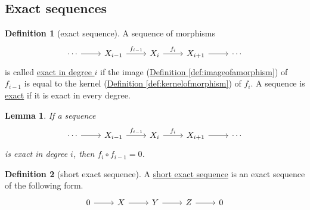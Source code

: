 \documentclass[a4paper]{report}
\newcommand{\defn}[1]{\ul{#1}}
\theoremstyle{definition}
\newtheorem{definition}{Definition}[section]
\theoremstyle{plain}
\newtheorem{lemma}{Lemma}[section]
\theoremstyle{remark}
\begin{document}
\subsection{Exact sequences}
\begin{definition}[exact sequence]
  \label{def:exactsequence}
  A sequence of morphisms
  \begin{equation*}
    \begin{tikzcd}
      \cdots
      \arrow[r]
      & X_{i-1}
      \arrow[r, "f_{i-1}"]
      & X_{i}
      \arrow[r, "f_{i}"]
      & X_{i+1}
      \arrow[r]
      & \cdots
    \end{tikzcd}
  \end{equation*}
  is called \defn{exact in degree $i$} if the image (\hyperref[def:imageofamorphism]{Definition \ref*{def:imageofamorphism}}) of $f_{i-1}$ is equal to the kernel (\hyperref[def:kernelofmorphism]{Definition \ref*{def:kernelofmorphism}}) of $f_{i}$. A sequence is \defn{exact} if it is exact in every degree.
\end{definition}

\begin{lemma}
  If a sequence
  \begin{equation*}
    \begin{tikzcd}
      \cdots
      \arrow[r]
      & X_{i-1}
      \arrow[r, "f_{i-1}"]
      & X_{i}
      \arrow[r, "f_{i}"]
      & X_{i+1}
      \arrow[r]
      & \cdots
    \end{tikzcd}
  \end{equation*}
  is exact in degree $i$, then $f_{i} \circ f_{i-1} = 0$.
\end{lemma}

\begin{definition}[short exact sequence]
  \label{def:shortexactsequence}
  A \defn{short exact sequence} is an exact sequence of the following form.
  \begin{equation*}
    \begin{tikzcd}
      0
      \arrow[r]
      & X
      \arrow[r]
      & Y
      \arrow[r]
      & Z
      \arrow[r]
      & 0
    \end{tikzcd}
  \end{equation*}
\end{definition}
\end{document}
